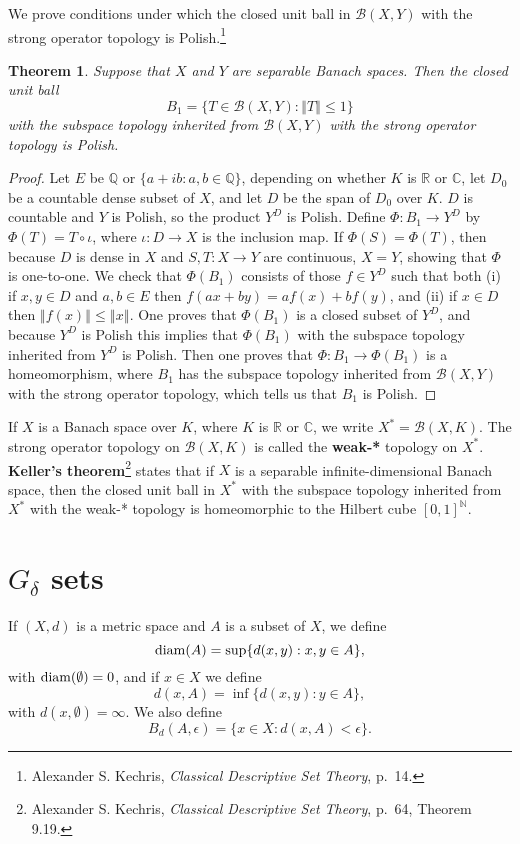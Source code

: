 \documentclass{article}
\newcommand{\diam}{\ensuremath\mathrm{diam}}
\newcommand{\norm}[1]{\left\Vert #1 \right\Vert}
\newtheorem{theorem}{Theorem}
\theoremstyle{definition}
\begin{document}
We  prove conditions under which the closed unit ball in $\mathscr{B}(X,Y)$ with the strong operator topology is Polish.\footnote{Alexander S. Kechris, {\em Classical Descriptive Set Theory}, p.~14.}
 
\begin{theorem}
Suppose that $X$ and $Y$ are separable Banach spaces. Then the closed unit ball
\[
B_1 = \{T \in \mathscr{B}(X,Y): \norm{T} \leq 1\}
\]
with the subspace topology inherited from $\mathscr{B}(X,Y)$ with the strong operator topology is Polish.
\end{theorem} 
\begin{proof}
Let $E$ be $\mathbb{Q}$ or $\{a+ib: a,b \in \mathbb{Q}\}$, depending on whether $K$ is $\mathbb{R}$ or $\mathbb{C}$,
 let $D_0$ be a countable dense subset of $X$, and let
$D$ be the span of $D_0$ over $K$. $D$ is countable and $Y$ is Polish, so the product $Y^D$ is Polish. 
Define $\Phi:B_1 \to Y^D$ by $\Phi(T) = T \circ \iota$, where $\iota:D \to X$ is the inclusion map. 
If $\Phi(S)=\Phi(T)$, then because $D$ is dense in $X$ and $S,T:X \to Y$ are continuous, $X=Y$, showing that $\Phi$ is one-to-one.
We check that
$\Phi(B_1)$ consists of those $f \in Y^D$ such that both (i) if $x,y \in D$ and $a,b \in E$ then $f(ax+by)=af(x)+bf(y)$, and (ii)
if $x \in D$ then $\norm{f(x)} \leq \norm{x}$. One proves that $\Phi(B_1)$ is a closed subset of $Y^D$, and because
$Y^D$ is Polish this implies that $\Phi(B_1)$ with the subspace topology inherited from $Y^D$ is Polish. Then one proves that $\Phi:B_1 \to \Phi(B_1)$ is a
homeomorphism, where $B_1$ has the subspace topology inherited from $\mathscr{B}(X,Y)$ with the strong operator
topology, which tells us that $B_1$ is Polish.
\end{proof}

If $X$ is a Banach space over $K$, where $K$ is $\mathbb{R}$ or $\mathbb{C}$, we write $X^*=\mathscr{B}(X,K)$. The strong
operator topology on $\mathscr{B}(X,K)$ is called the \textbf{weak-*} topology on $X^*$.
\textbf{Keller's theorem}\footnote{Alexander S. Kechris, {\em Classical Descriptive Set Theory}, p.~64, Theorem 9.19.}
 states that if $X$ is a separable infinite-dimensional Banach space, then the closed unit ball in $X^*$ with the subspace
topology inherited from $X^*$ with the weak-* topology is homeomorphic to the Hilbert cube $[0,1]^\mathbb{N}$.

\section{$G_\delta$ sets}
If $(X,d)$ is a metric space and $A$ is a subset of $X$, we define
\[
\diam(A) = \sup\{ d(x,y): x,y \in A\},
\]
with $\diam(\emptyset)=0$, and if $x \in X$ we define
\[
d(x,A) = \inf\{d(x,y): y \in A\},
\]
with $d(x,\emptyset)=\infty$. 
We also define
\[
B_d(A,\epsilon) = \{x \in X: d(x,A)<\epsilon\}.
\]
\end{document}

